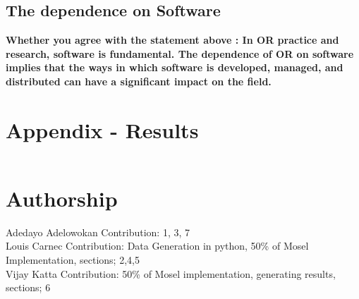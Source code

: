 \documentclass[a4paper,11pt]{article}
\begin{document}
\subsection{The dependence on Software}
\textbf{Whether you agree with the statement above : In OR practice and research, software is fundamental. The dependence
of OR on software implies that the ways in which software is developed, managed, and distributed can
have a significant impact on the field.}

























\clearpage
\section*{Appendix - Results}

\begin{lstlisting}

\end{lstlisting}

\section*{Authorship}

Adedayo Adelowokan Contribution: 1, 3, 7 \\
\newline
Louis Carnec Contribution: Data Generation in python, 50\% of Mosel Implementation, sections; 2,4,5 \\
\newline
Vijay Katta Contribution: 50\% of Mosel implementation, generating results, sections; 6 \\


\clearpage


\end{document}
